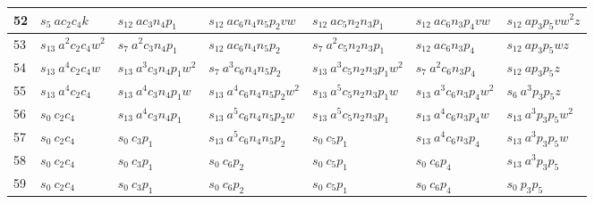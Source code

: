 \documentclass[preliminary,copyright,creativecommons]{eptcs}
\newcommand{\myway}[1]{\raisebox{-4pt}{\rule{0pt}{16pt}}\colorbox[rgb]{.7,.7,.7}{#1}}
\theoremstyle{remark}
\begin{document}
\begin{table}[h]
\begin{center}
\begin{tabular}{ | l | l | l | l | l | l | l | }
52 & $s_5~ ac_2c_4k$ & $s_{12}~ ac_3n_4p_1$ & $s_{12}~ ac_6n_4n_5p_2vw$ & $s_{12}~ ac_5n_2n_3p_1$ & $s_{12}~ ac_6n_3p_4vw$ & $s_{12}~ ap_3p_5vw^{2}z$ \\ \hline
53 & $s_{13}~ a^{2}c_2c_4w^{2}$ & $s_7~ a^{2}c_3n_4p_1$ & $s_{12}~ ac_6n_4n_5p_2$ & $s_7~ a^{2}c_5n_2n_3p_1$ & $s_{12}~ ac_6n_3p_4$ & $s_{12}~ ap_3p_5wz$ \\ \hline
54 & $s_{13}~ a^{4}c_2c_4w$ & $s_{13}~ a^{3}c_3n_4p_1w^{2}$ & $s_7~ a^{3}c_6n_4n_5p_2$ & $s_{13}~ a^{3}c_5n_2n_3p_1w^{2}$ & $s_7~ a^{2}c_6n_3p_4$ & $s_{12}~ ap_3p_5z$ \\ \hline
55 & $s_{13}~ a^{4}c_2c_4$ & $s_{13}~ a^{4}c_3n_4p_1w$ & $s_{13}~ a^{4}c_6n_4n_5p_2w^{2}$ & $s_{13}~ a^{5}c_5n_2n_3p_1w$ & $s_{13}~ a^{3}c_6n_3p_4w^{2}$ & $s_6~ a^{3}p_3p_5z$ \\ \hline
56 & $s_0~ c_2c_4$ & $s_{13}~ a^{4}c_3n_4p_1$ & $s_{13}~ a^{5}c_6n_4n_5p_2w$ & $s_{13}~ a^{5}c_5n_2n_3p_1$ & $s_{13}~ a^{4}c_6n_3p_4w$ & $s_{13}~ a^{3}p_3p_5w^{2}$ \\ \hline
57 & $s_0~ c_2c_4$ & $s_0~ c_3p_1$ & $s_{13}~ a^{5}c_6n_4n_5p_2$ & $s_0~ c_5p_1$ & $s_{13}~ a^{4}c_6n_3p_4$ & $s_{13}~ a^{3}p_3p_5w$ \\ \hline
58 & $s_0~ c_2c_4$ & $s_0~ c_3p_1$ & $s_0~ c_6p_2$ & $s_0~ c_5p_1$ & $s_0~ c_6p_4$ & $s_{13}~ a^{3}p_3p_5$ \\ \hline
59 & \myway{$s_0~ c_2c_4$} & \myway{$s_0~ c_3p_1$} & \myway{$s_0~ c_6p_2$} & \myway{$s_0~ c_5p_1$} & \myway{$s_0~ c_6p_4$} & \myway{$s_0~ p_3p_5$} \\ \hline
\end{tabular}
\end{center}
\end{table}
\end{document}
